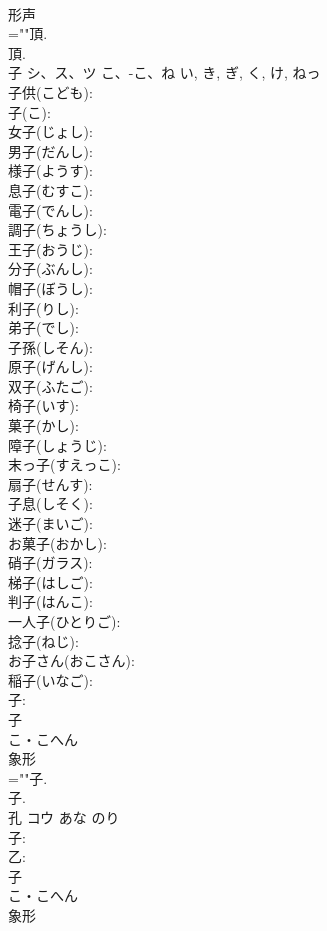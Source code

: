 \documentclass[8pt]{extreport}
\begin{document}
\begin{CJK}{UTF8}{min}
\\	形声 
\\	=""頂.
\\	頂.
\\	子	シ、ス、ツ	こ、-こ、ね	い, き, ぎ, く, け, ねっ	
\\	子供(こども): 
\\	子(こ): 
\\	女子(じょし): 
\\	男子(だんし): 
\\	様子(ようす): 
\\	息子(むすこ): 
\\	電子(でんし): 
\\	調子(ちょうし): 
\\	王子(おうじ): 
\\	分子(ぶんし): 
\\	帽子(ぼうし): 
\\	利子(りし): 
\\	弟子(でし): 
\\	子孫(しそん): 
\\	原子(げんし): 
\\	双子(ふたご): 
\\	椅子(いす): 
\\	菓子(かし): 
\\	障子(しょうじ): 
\\	末っ子(すえっこ): 
\\	扇子(せんす): 
\\	子息(しそく): 
\\	迷子(まいご): 
\\	お菓子(おかし): 
\\	硝子(ガラス): 
\\	梯子(はしご): 
\\	判子(はんこ): 
\\	一人子(ひとりご): 
\\	捻子(ねじ): 
\\	お子さん(おこさん): 
\\	稲子(いなご): 
\\	子: 
\\	子	
\\	こ・こへん	
\\	象形 
\\	=""子.
\\	子.
\\	孔	コウ	あな	のり	
\\	子: 
\\	乙: 
\\	子	
\\	こ・こへん	
\\	象形 

\end{CJK}
\end{document}
